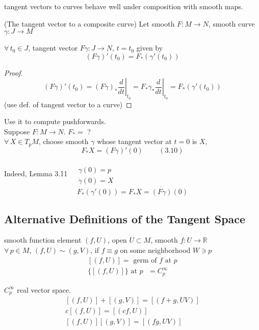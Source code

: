 tangent vectors to curves behave well under composition with smooth maps.  

\begin{proposition}[3.12] (The tangent vector to a composite curve)
 Let smooth $F: M \to N$, smooth curve $\gamma : J \to M$

$\forall\, t_0 \in J$, tangent vector $F\gamma:J\to N$, $t=t_0$ given by 
\[
(F\gamma)'(t_0) = F_*(\gamma'(t_0))
\]
\end{proposition}

\begin{proof}
\[
(F\gamma)'(t_0) = \left. (F\gamma)_* \frac{d}{dt} \right|_{t_0} = F_* \gamma_* \left. \frac{d}{dt} \right|_{t_0} = F_*(\gamma'(t_0))
\]
(use def. of tangent vector to a curve)
\end{proof}

Use it to compute pushforwards. \\
Suppose $F:M \to N$.  $F_* = $ ? \\
$\forall \, X \in T_pM$, choose smooth $\gamma$ whose tangent vector at $t=0$ is $X$, 
\[
F_* X = (F\gamma)'(0) \quad \quad \, (3.10)
\]

Indeed, Lemma 3.11 $\begin{aligned} & \quad \\ 
  & \gamma(0) = p \\ 
  & \dot{\gamma}(0) = X \end{aligned}$
\[
F_*(\gamma'(0)) = F_*X = \dot{ (F\gamma)}(0)
\]

\subsection*{ Alternative Definitions of the Tangent Space}

smooth function element $(f,U)$, open $U \subset M$, smooth $f:U \to \mathbb{R}$\\
$\forall \, p \in M$, $(f,U) \sim (g,V)$, if $f\equiv g$ on some neighborhood $W \ni p$
\[
\begin{gathered}
  [ (f,U)] = \text{ germ of $f$ at $p$} \\ 
 \lbrace [ (f,U) ] \rbrace \text{ at $p$ } = C_p^{\infty}
\end{gathered}
\]

$C^{\infty}_p$ real vector space.  
\[
\begin{gathered}
  \left[ (f,U) \right] + [(g,V)] = [(f+g, UV) ] \\ 
 c[(f,U)] = [(cf, U) ] \\ 
 [(f,U)] [(g,V)] = [ (fg, UV)] 
\end{gathered}
\]



